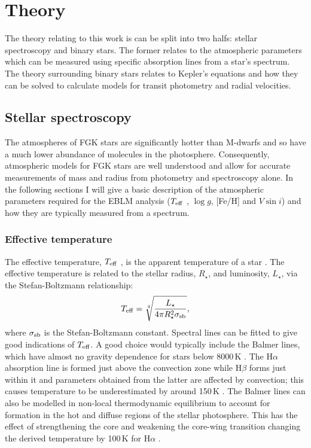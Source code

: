\chapter{Theory}\label{chapter:theory}

The theory relating to this work is can be split into two halfs: stellar spectroscopy and binary stars. The former relates to the atmospheric parameters which can be measured using specific absorption lines from a star's spectrum. The theory surrounding binary stars relates to Kepler's equations and how they can be solved to calculate models for transit photometry and radial velocities. 

\section{Stellar spectroscopy}

The atmospheres of FGK stars are significantly hotter than M-dwarfs and so have a much lower abundance of molecules in the photosphere. Consequently, atmospheric models for FGK stars are well understood and allow for accurate measurements of mass and radius from photometry and spectroscopy alone. In the following sections I will give a basic description of the atmospheric parameters required for the EBLM analysis ($T_{\rm eff}$ , $\log g$, [Fe/H] and $V \sin i$) and how they are typically measured from a spectrum.

\subsection{Effective temperature}

The effective temperature, $T_{\rm eff}$ , is the apparent temperature of a star \citep{Doyle2015}. The effective temperature is related to the stellar radius, $R_\star$, and luminosity, $L_\star$, via the  Stefan-Boltzmann relationship:
%
\begin{equation}
    T_{\rm eff} = \sqrt[4]{\frac{L_\star}{4 \pi R_\star^2 \sigma_{\rm sb}}},
\end{equation}
% 
where $\sigma_{\rm sb}$ is the Stefan-Boltzmann constant.  Spectral lines can be fitted to give good indications of  $T_{\rm eff}$. A good choice would typically include the Balmer lines, which have almost no gravity dependence for stars below 8000\,K \citep{2008oasp.book.....G}. The H$\alpha$ absorption line is formed just above the convection zone while H$\beta$ forms just within it and parameters obtained from the latter are affected by convection; this causes temperature to be underestimated by around 150\,K \citep{2014MNRAS.444.3592D}. The Balmer lines can also be modelled in non-local thermodynamic equilibrium to account for formation in the hot and diffuse regions of the stellar photosphere. This has the effect of strengthening the core and weakening the core-wing transition changing the derived temperature by 100\,K for H$\alpha$ \citep{Doyle2015}.


